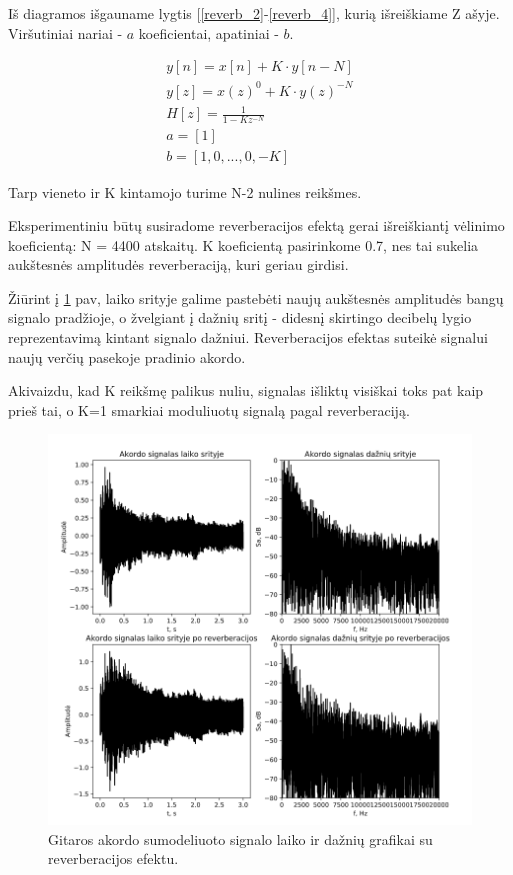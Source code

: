\documentclass[10pt,a4paper,twocolumn]{article}
\begin{document}
Iš diagramos išgauname lygtis [\ref{reverb_2}-\ref{reverb_4}], kurią išreiškiame Z ašyje. Viršutiniai nariai - $a$ koeficientai, apatiniai - $b$.


\begin{eqnarray}
\label{reverb_2}
y[n] = x[n] + K \cdot y[n-N] \\
y[z] = x(z)^0 + K \cdot y(z)^{-N} \\
H[z] = \frac{1}{1-Kz^{-N}} \\
a = [1] \\
\label{reverb_4}
b = [1,0,...,0,-K]
\end{eqnarray}


Tarp vieneto ir K kintamojo turime N-2 nulines reikšmes.

Eksperimentiniu būtų susiradome reverberacijos efektą gerai išreiškiantį vėlinimo koeficientą: N = 4400 atskaitų. K koeficientą pasirinkome 0.7, nes tai sukelia aukštesnės amplitudės reverberaciją, kuri geriau girdisi.

Žiūrint į \ref{reverb_3} pav, laiko srityje galime pastebėti naujų aukštesnės amplitudės bangų signalo pradžioje, o žvelgiant į dažnių sritį - didesnį skirtingo decibelų lygio reprezentavimą kintant signalo dažniui. Reverberacijos efektas suteikė signalui naujų verčių pasekoje pradinio akordo.

Akivaizdu, kad K reikšmę palikus nuliu, signalas išliktų visiškai toks pat kaip prieš tai, o K=1 smarkiai moduliuotų signalą pagal reverberaciją.

\begin{figure} %
	[!h]
	\centering
	\includegraphics*[width=.9\columnwidth]{reverb_3.png} %
	\caption{Gitaros akordo sumodeliuoto signalo laiko ir dažnių grafikai su reverberacijos efektu.}
	\label{reverb_3}
	\vspace{6pt}
\end{figure}
\end{document}
